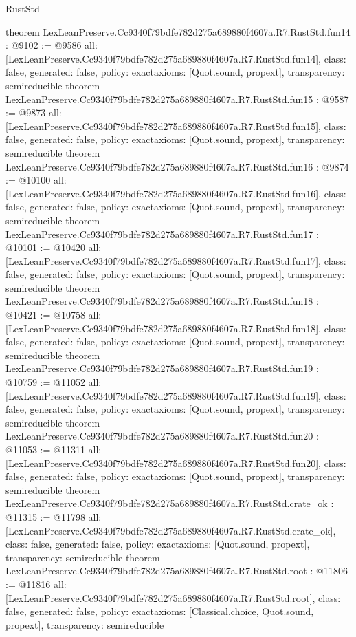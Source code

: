 \begin{lexlean}{RustStd}
\begin{coremodule}
{}
theorem LexLeanPreserve.Cc9340f79bdfe782d275a689880f4607a.R7.RustStd.fun14 : @9102 := @9586 {
  all: [LexLeanPreserve.Cc9340f79bdfe782d275a689880f4607a.R7.RustStd.fun14],
  class: false,
  generated: false,
  policy: exact{axioms: [Quot.sound, propext]},
  transparency: semireducible
}
theorem LexLeanPreserve.Cc9340f79bdfe782d275a689880f4607a.R7.RustStd.fun15 : @9587 := @9873 {
  all: [LexLeanPreserve.Cc9340f79bdfe782d275a689880f4607a.R7.RustStd.fun15],
  class: false,
  generated: false,
  policy: exact{axioms: [Quot.sound, propext]},
  transparency: semireducible
}
theorem LexLeanPreserve.Cc9340f79bdfe782d275a689880f4607a.R7.RustStd.fun16 : @9874 := @10100 {
  all: [LexLeanPreserve.Cc9340f79bdfe782d275a689880f4607a.R7.RustStd.fun16],
  class: false,
  generated: false,
  policy: exact{axioms: [Quot.sound, propext]},
  transparency: semireducible
}
theorem LexLeanPreserve.Cc9340f79bdfe782d275a689880f4607a.R7.RustStd.fun17 : @10101 := @10420 {
  all: [LexLeanPreserve.Cc9340f79bdfe782d275a689880f4607a.R7.RustStd.fun17],
  class: false,
  generated: false,
  policy: exact{axioms: [Quot.sound, propext]},
  transparency: semireducible
}
theorem LexLeanPreserve.Cc9340f79bdfe782d275a689880f4607a.R7.RustStd.fun18 : @10421 := @10758 {
  all: [LexLeanPreserve.Cc9340f79bdfe782d275a689880f4607a.R7.RustStd.fun18],
  class: false,
  generated: false,
  policy: exact{axioms: [Quot.sound, propext]},
  transparency: semireducible
}
theorem LexLeanPreserve.Cc9340f79bdfe782d275a689880f4607a.R7.RustStd.fun19 : @10759 := @11052 {
  all: [LexLeanPreserve.Cc9340f79bdfe782d275a689880f4607a.R7.RustStd.fun19],
  class: false,
  generated: false,
  policy: exact{axioms: [Quot.sound, propext]},
  transparency: semireducible
}
theorem LexLeanPreserve.Cc9340f79bdfe782d275a689880f4607a.R7.RustStd.fun20 : @11053 := @11311 {
  all: [LexLeanPreserve.Cc9340f79bdfe782d275a689880f4607a.R7.RustStd.fun20],
  class: false,
  generated: false,
  policy: exact{axioms: [Quot.sound, propext]},
  transparency: semireducible
}
theorem LexLeanPreserve.Cc9340f79bdfe782d275a689880f4607a.R7.RustStd.crate_ok : @11315 := @11798 {
  all: [LexLeanPreserve.Cc9340f79bdfe782d275a689880f4607a.R7.RustStd.crate_ok],
  class: false,
  generated: false,
  policy: exact{axioms: [Quot.sound, propext]},
  transparency: semireducible
}
theorem LexLeanPreserve.Cc9340f79bdfe782d275a689880f4607a.R7.RustStd.root : @11806 := @11816 {
  all: [LexLeanPreserve.Cc9340f79bdfe782d275a689880f4607a.R7.RustStd.root],
  class: false,
  generated: false,
  policy: exact{axioms: [Classical.choice, Quot.sound, propext]},
  transparency: semireducible
}


\end{coremodule}
\end{lexlean}
